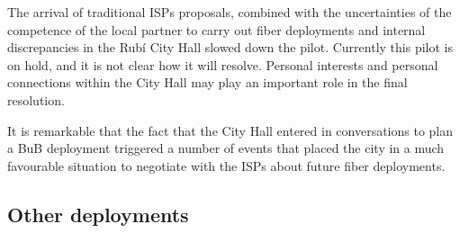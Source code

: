 The arrival of traditional ISPs proposals, combined with the uncertainties of the competence of the local partner to carry out fiber deployments and internal discrepancies in the Rub\'{i} City Hall slowed down the pilot.
Currently this pilot is on hold, and it is not clear how it will resolve.
Personal interests and personal connections within the City Hall may play an important role in the final resolution.

It is remarkable that the fact that the City Hall entered in conversations to plan a BuB deployment triggered a number of events that placed the city in a much favourable situation to negotiate with the ISPs about future fiber deployments.

\subsection{Other deployments}

